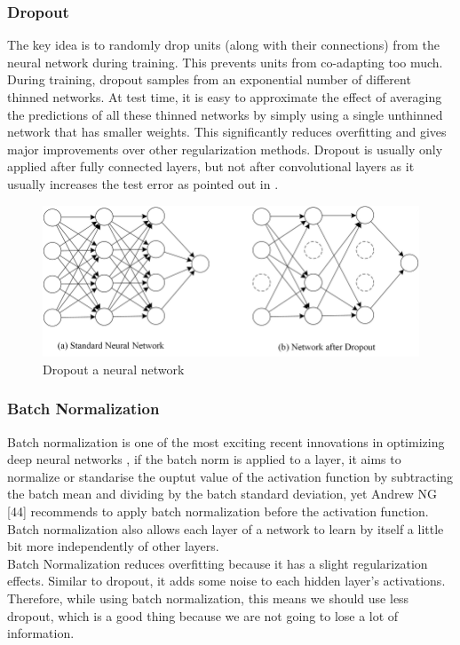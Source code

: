 \subsubsection{Dropout}
The key idea is to randomly drop units (along with their connections) from the neural
network during training. This prevents units from co-adapting too much.
During training, dropout samples from an exponential number of different thinned
networks. At test time, it is easy to approximate the effect of averaging the predictions
of all these thinned networks by simply using a single unthinned network that has
smaller weights.\cite{art20} This significantly reduces overfitting and gives major improvements
over other regularization methods. Dropout is usually only applied after fully connected
layers, but not after convolutional layers as it usually increases the test error as pointed
out in \cite{art23}.
\begin{figure}[!h]
    \centering
    \includegraphics[width=1.1\textwidth]{chapters/chapter02/fig02/Dropout.png}
    \caption{Dropout a neural network}
    \label{fig:my_label}
\end{figure}
\subsubsection{Batch Normalization}
Batch normalization is one of the most exciting recent innovations in optimizing deep
neural networks \cite{art20}, if the batch norm is applied to a layer, it aims to normalize or standarise the ouptut value of the activation function by subtracting the batch mean
and dividing by the batch standard deviation, yet Andrew NG [44] recommends to apply
batch normalization before the activation function.
Batch normalization also allows each layer of a network to learn by itself a little bit more
independently of other layers.\cite{c2}
\cite{art24} \\

Batch Normalization reduces overfitting because it has a slight regularization effects.
Similar to dropout, it adds some noise to each hidden layer’s activations. Therefore, while
using batch normalization, this means we should use less dropout, which is a good thing
because we are not going to lose a lot of information. \cite{art24}
